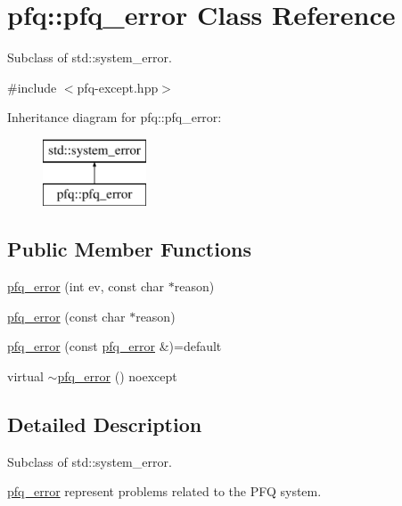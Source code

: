 \hypertarget{classpfq_1_1pfq__error}{\section{pfq\+:\+:pfq\+\_\+error Class Reference}
\label{classpfq_1_1pfq__error}
}


Subclass of std\+::system\+\_\+error.  




{\ttfamily \#include $<$pfq-\/except.\+hpp$>$}

Inheritance diagram for pfq\+:\+:pfq\+\_\+error\+:\begin{figure}[H]
\begin{center}
\leavevmode
\includegraphics[height=2.000000cm]{classpfq_1_1pfq__error}
\end{center}
\end{figure}
\subsection*{Public Member Functions}
\begin{DoxyCompactItemize}
\item 
\hyperlink{classpfq_1_1pfq__error_a200dca27eee04a6da834364b9342a81d}{pfq\+\_\+error} (int ev, const char $\ast$reason)
\item 
\hyperlink{classpfq_1_1pfq__error_a5af35c9d9dea6aceff0672b92ad6b844}{pfq\+\_\+error} (const char $\ast$reason)
\item 
\hyperlink{classpfq_1_1pfq__error_a64f033ecc5b20bd22872fee3f22fd499}{pfq\+\_\+error} (const \hyperlink{classpfq_1_1pfq__error}{pfq\+\_\+error} \&)=default
\item 
virtual \hyperlink{classpfq_1_1pfq__error_a0aeb73a633e889817967897ef28b3512}{$\sim$pfq\+\_\+error} () noexcept
\end{DoxyCompactItemize}


\subsection{Detailed Description}
Subclass of std\+::system\+\_\+error. 

\hyperlink{classpfq_1_1pfq__error}{pfq\+\_\+error} represent problems related to the P\+F\+Q system. 

